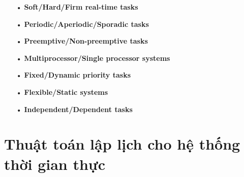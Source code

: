 \documentclass[a4paper,10pt]{report}
\begin{document}
\begin{itemize}
\item[•] \textbf{Soft/Hard/Firm real-time tasks}
\item[•] \textbf{Periodic/Aperiodic/Sporadic tasks} 
\item[•] \textbf{Preemptive/Non-preemptive tasks}
\item[•] \textbf{Multiprocessor/Single processor systems}
\item[•] \textbf{Fixed/Dynamic priority tasks}
\item[•] \textbf{Flexible/Static systems}
\item[•] \textbf{Independent/Dependent tasks}
\end{itemize}
\chapter{Thuật toán lập lịch cho hệ thống thời gian thực}
\end{document}

